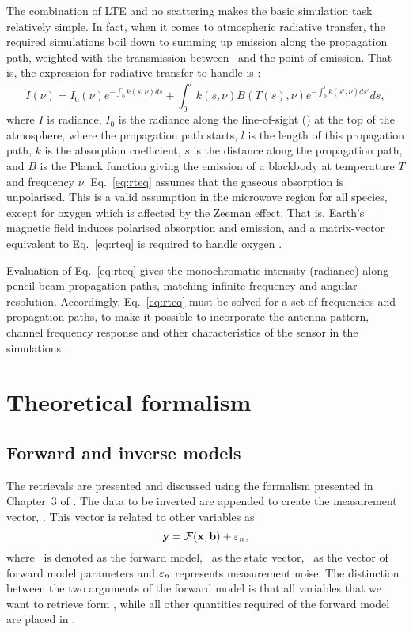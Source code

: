 The combination of LTE and no scattering makes the basic simulation task
relatively simple. In fact, when it comes to atmospheric radiative transfer,
the required simulations boil down to summing up emission along the propagation
path, weighted with the transmission between \smr\ and the point of emission.
That is, the expression for radiative transfer to handle is \citep[see
e.g.][Eq.~50]{chandrasekhar:60}:
\begin{equation}
  \label{eq:rteq}
     I(\nu) = I_0(\nu)e^{-\int^l_0{k(s,\nu)ds}} + 
     \int^l_0{k(s,\nu)B(T(s),\nu) e^{-\int^l_0{k(s',\nu)ds'}} ds},
\end{equation}
where $I$ is radiance, $I_0$ is the radiance along the line-of-sight (\LOS) at
the top of the atmosphere, where the propagation path starts, $l$ is the length
of this propagation path, $k$ is the absorption coefficient, $s$ is the
distance along the propagation path, and $B$ is the Planck function giving the
emission of a blackbody at temperature $T$ and frequency $\nu$.
Eq.~\ref{eq:rteq} assumes that the gaseous absorption is unpolarised. This is a
valid assumption in the microwave region for all species, except for oxygen which
is affected by the Zeeman effect. That is, Earth's magnetic field induces
polarised absorption and emission, and a matrix-vector equivalent to
Eq.~\ref{eq:rteq} is required to handle oxygen \citep[see
e.g.][]{larsson:zeema:14}.

Evaluation of Eq.~\ref{eq:rteq} gives the monochromatic intensity (radiance)
along pencil-beam propagation paths, matching infinite frequency and angular
resolution. Accordingly, Eq.~\ref{eq:rteq} must be solved for a set of
frequencies and propagation paths, to make it possible to incorporate the
antenna pattern, channel frequency response and other characteristics of the
sensor in the simulations \citep[see e.g.][]{eriksson:studi:02,read2006clear}.


\section{Theoretical formalism}
\label{sec:formalism}

\subsection{Forward and inverse models}
%
The retrievals are presented and discussed using the formalism presented in
Chapter~3 of \citet{rodgers:00}. The data to be inverted are appended to create
the measurement vector, \MsrVct. This vector is related to other variables as
\begin{equation}
  \label{eq:fmodel1}
  \mathbf{y} = \mathcal{F}(\mathbf{x},\mathbf{b}) + \varepsilon_n,
\end{equation}
where \FrwMdl\ is denoted as the forward model, \SttVct\ as the state vector,
\FrwMdlVct\ as the vector of forward model parameters and $\varepsilon_n$
represents measurement noise. The distinction between the two arguments of the
forward model is that all variables that we want to retrieve form \SttVct,
while all other quantities required of the forward model are placed in
\FrwMdlVct. 

